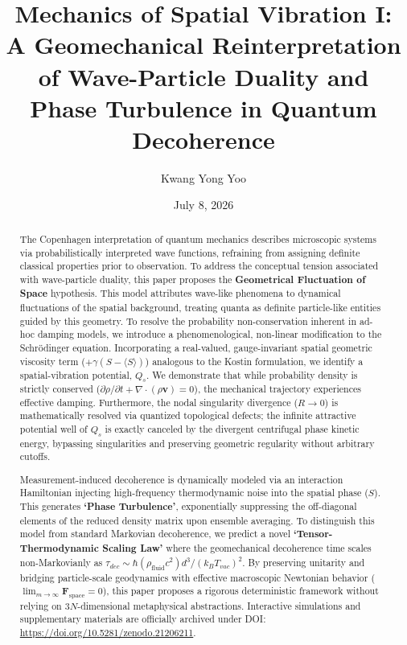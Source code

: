 \documentclass[reprint,amsmath,amssymb,aps,prd]{revtex4-2}
\begin{document}

\title{Mechanics of Spatial Vibration I: A Geomechanical Reinterpretation of Wave-Particle Duality and Phase Turbulence in Quantum Decoherence}

\author{Kwang Yong Yoo}
\date{July 8, 2026}

\begin{abstract}
The Copenhagen interpretation of quantum mechanics describes microscopic systems via probabilistically interpreted wave functions, refraining from assigning definite classical properties prior to observation.
To address the conceptual tension associated with wave-particle duality, this paper proposes the \textbf{Geometrical Fluctuation of Space} hypothesis.
This model attributes wave-like phenomena to dynamical fluctuations of the spatial background, treating quanta as definite particle-like entities guided by this geometry.
To resolve the probability non-conservation inherent in ad-hoc damping models, we introduce a phenomenological, non-linear modification to the Schr\"{o}dinger equation. Incorporating a real-valued, gauge-invariant spatial geometric viscosity term ($+\gamma(S - \langle S \rangle)$) analogous to the Kostin formulation, we identify a spatial-vibration potential, $Q_s$. We demonstrate that while probability density is strictly conserved ($\partial\rho/\partial t + \nabla\cdot(\rho\mathbf{v})=0$), the mechanical trajectory experiences effective damping. Furthermore, the nodal singularity divergence ($R \to 0$) is mathematically resolved via quantized topological defects; the infinite attractive potential well of $Q_s$ is exactly canceled by the divergent centrifugal phase kinetic energy, bypassing singularities and preserving geometric regularity without arbitrary cutoffs.

Measurement-induced decoherence is dynamically modeled via an interaction Hamiltonian injecting high-frequency thermodynamic noise into the spatial phase ($S$).
This generates \textbf{`Phase Turbulence'}, exponentially suppressing the off-diagonal elements of the reduced density matrix upon ensemble averaging.
To distinguish this model from standard Markovian decoherence, we predict a novel \textbf{`Tensor-Thermodynamic Scaling Law'} where the geomechanical decoherence time scales non-Markovianly as $\tau_{dec} \sim \hbar (\rho_{\mathrm{fluid}} c^2) d^3 / (k_B T_{vac})^2$.
By preserving unitarity and bridging particle-scale geodynamics with effective macroscopic Newtonian behavior ($\lim_{m \to \infty} \mathbf{F}_{\mathrm{space}} = 0$), this paper proposes a rigorous deterministic framework without relying on $3N$-dimensional metaphysical abstractions.
Interactive simulations and supplementary materials are officially archived under DOI: \url{https://doi.org/10.5281/zenodo.21206211}.
\end{abstract}
\end{document}
